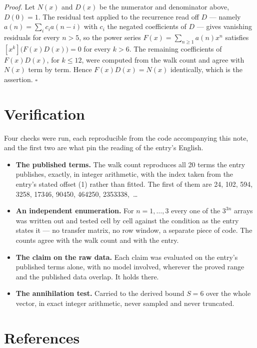 \documentclass[11pt]{article}
\theoremstyle{definition}
\begin{document}
{\itshape Proof.} Let $N(x)$ and $D(x)$ be the numerator and denominator above, $D(0)=1$. The residual test applied to the recurrence read off $D$ --- namely $a(n) = \sum_i c_i a(n-i)$ with $c_i$ the negated coefficients of $D$ --- gives vanishing residuals for every $n > 5$, so the power series $F(x)=\sum_{n\ge 1}a(n)x^n$ satisfies $[x^k]\bigl(F(x)D(x)\bigr) = 0$ for every $k > 6$. The remaining coefficients of $F(x)D(x)$, for $k \le 12$, were computed from the walk count and agree with $N(x)$ term by term. Hence $F(x)D(x) = N(x)$ identically, which is the assertion. $\square$

\section{Verification}

Four checks were run, each reproducible from the code accompanying this note, and the first two are what pin the reading of the entry's English.

\begin{itemize}

\item {\bfseries The published terms.} The walk count reproduces all 20 terms the entry publishes, exactly, in integer arithmetic, with the index taken from the entry's stated offset (1) rather than fitted. The first of them are 24, 102, 594, 3258, 17346, 90450, 464250, 2353338,~\dots

\item {\bfseries An independent enumeration.} For $n = 1,\dots,3$ every one of the $3^{3n}$ arrays was written out and tested cell by cell against the condition as the entry states it --- no transfer matrix, no row window, a separate piece of code. The counts agree with the walk count and with the entry.

\item {\bfseries The claim on the raw data.} Each claim was evaluated on the entry's published terms alone, with no model involved, wherever the proved range and the published data overlap. It holds there.

\item {\bfseries The annihilation test.} Carried to the derived bound $S = 6$ over the whole vector, in exact integer arithmetic, never sampled and never truncated.

\end{itemize}

\section{References}
\end{document}
